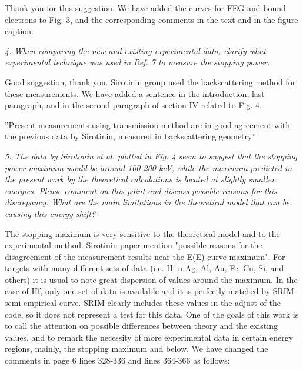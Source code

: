 \documentclass[a4paper,10pt]{article}
\begin{document}
\vspace{0.1cm}
{\color{red} Thank you for this suggestion. We have added the curves for FEG and bound electrons to Fig. 3, and the corresponding comments in the text and in the figure caption.}

\vspace{0.25cm}
\textsl{
4. When comparing the new and existing experimental data, clarify what
experimental technique was used in Ref. 7 to measure the stopping
power.}

\vspace{0.1cm}
{\color{red} Good suggestion, thank you. Sirotinin group used the backscattering method for these measurements. We have added a sentence in the introduction, last paragraph, and in the second paragraph of section IV related to Fig. 4.}

{\small ''Present measurements using transmission method are in good agreement with the previous data by 
Sirotinin, measured in backscattering geometry''}

\vspace{0.25cm}
\textsl{
5. The data by Sirotonin et al. plotted in Fig. 4 seem to suggest that
the stopping power maximum would be around 100-200 keV, while the
maximum predicted in the present work by the theoretical calculations
is located at slightly smaller energies. Please comment on this point
and discuss possible reasons for this discrepancy: What are the main
limitations in the theoretical model that can be causing this energy
shift?}

\vspace{0.1cm}
{\color{red} The stopping maximum is very sensitive to the theoretical model and to the experimental method. Sirotinin paper mention "possible reasons for the disagreement of the measurement results near the E(E) curve maximum". 
For targets with many different sets of data (i.e. H in Ag, Al, Au, Fe, Cu, Si, and others) it is usual to note great dispersion of values around the maximum. In the case of Hf, only one set of data is available and it is perfectly matched by SRIM semi-empirical curve. SRIM clearly includes these values in the adjust of the code, so it does not represent a test for this data. One of the goals of this work is to call the attention on possible differences between theory and the existing values, and to remark the necessity of more experimental data in certain energy regions, mainly, the stopping maximum and below. We have changed the comments in page 6 lines 328-336 and lines 364-366 as follows:}
\end{document}
